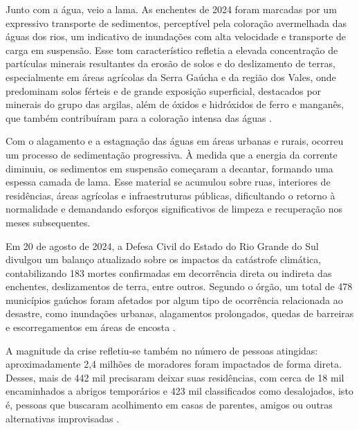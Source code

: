 Junto com a água, veio a lama. As enchentes de 2024 foram marcadas por um expressivo transporte de sedimentos,
perceptível pela coloração avermelhada das águas dos rios, um indicativo de inundações com alta velocidade e transporte
de carga em suspensão. Esse tom característico refletia a elevada concentração de partículas minerais resultantes da
erosão de solos e do deslizamento de terras, especialmente em áreas agrícolas da Serra Gaúcha e da região dos Vales,
onde predominam solos férteis e de grande exposição superficial, destacados por minerais do grupo das argilas, além de
óxidos e hidróxidos de ferro e manganês, que também contribuíram para a coloração intensa das águas
\cite{jornaluniversidade}.

Com o alagamento e a estagnação das águas em áreas urbanas e rurais, ocorreu um processo de sedimentação progressiva. À
medida que a energia da corrente diminuiu, os sedimentos em suspensão começaram a decantar, formando uma espessa camada
de lama. Esse material se acumulou sobre ruas, interiores de residências, áreas agrícolas e infraestruturas públicas,
dificultando o retorno à normalidade e demandando esforços significativos de limpeza e recuperação nos meses
subsequentes.

Em 20 de agosto de 2024, a Defesa Civil do Estado do Rio Grande do Sul divulgou um balanço atualizado sobre os impactos
da catástrofe climática, contabilizando 183 mortes confirmadas em decorrência direta ou indireta das enchentes,
deslizamentos de terra, entre outros. Segundo o órgão, um total de 478 municípios gaúchos foram afetados por algum tipo
de ocorrência relacionada ao desastre, como inundações urbanas, alagamentos prolongados, quedas de barreiras e
escorregamentos em áreas de encosta \cite{defesacivil}.

A magnitude da crise refletiu-se também no número de pessoas atingidas: aproximadamente 2,4 milhões de moradores foram
impactados de forma direta. Desses, mais de 442 mil precisaram deixar suas residências, com cerca de 18 mil encaminhados
a abrigos temporários e 423 mil classificados como desalojados, isto é, pessoas que buscaram acolhimento em casas de
parentes, amigos ou outras alternativas improvisadas \cite{defesacivil}.



